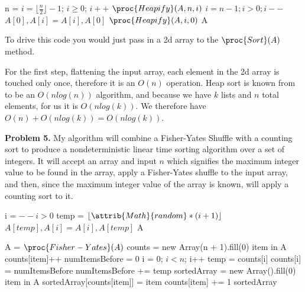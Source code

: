 \documentclass{article}
\begin{document}
\begin{codebox}
    \li n = 
    \li \For $i = \lfloor \frac{n}{2} \rfloor - 1$; $i \geq 0$; $i++$ \Do
    \li $\proc{Heapify}(A, n, i)$ \End
    \li
    \li \For $i = n - 1; i > 0; i--$ \Do
    \li $A[0], A[i] = A[i], A[0]$
    \li $\proc{Heapify}(A, i, 0)$ \End
    \li
    \li \Return A
\end{codebox}

\begin{codebox}
    \li \Return {}
\end{codebox}

To drive this code you would just pass in a 2d array to the $\proc{Sort}(A)$ method.

\hfill

For the first step, flattening the input array, each element in the 2d array is touched only once, therefore it is an $O(n)$ operation. Heap sort is known from \cite{CLRS} to be an $O(nlog(n))$ algorithm, and because we have $k$ lists and $n$ total elements, for us it is $O(nlog(k))$. We therefore have $O(n) + O(nlog(k)) = O(nlog(k))$.

\hfill

\textbf{Problem 5.} My algorithm will combine a Fisher-Yates Shuffle \cite{website:5} with a counting sort \cite{website:6} to produce a nondeterministic linear time sorting algorithm over a set of integers. It will accept an array and input $n$ which signifies the maximum integer value to be found in the array, apply a Fisher-Yates shuffle to the input array, and then, since the maximum integer value of the array is known, will apply a counting sort to it. 

\begin{codebox}
    \li i = 
    \li
    \li \While $--i > 0$ \Do
    \li temp = $\lfloor \attrib{Math}{random} * (i + 1) \rfloor$
    \li $A[temp], A[i] = A[i], A[temp]$ \End
    \li
    \li \Return A
\end{codebox}

\begin{codebox}
    \li A = $\proc{Fisher-Yates}(A)$
    \li
    \li counts = new Array(n + 1).fill(0)
    \li \For item in A \Do
    \li counts[item]++ \End
    \li
    \li numItemsBefore = 0
    \li \For i = 0; $i < n$; i++ \Do
    \li temp = counts[i]
    \li counts[i] = numItemsBefore
    \li numItemsBefore += temp \End
    \li
    \li sortedArray = new Array().fill(0)
    \li \For item in A \Do
    \li sortedArray[counts[item]] = item
    \li counts[item] += 1 \End
    \li
    \li \Return sortedArray
\end{codebox}
\end{document}
